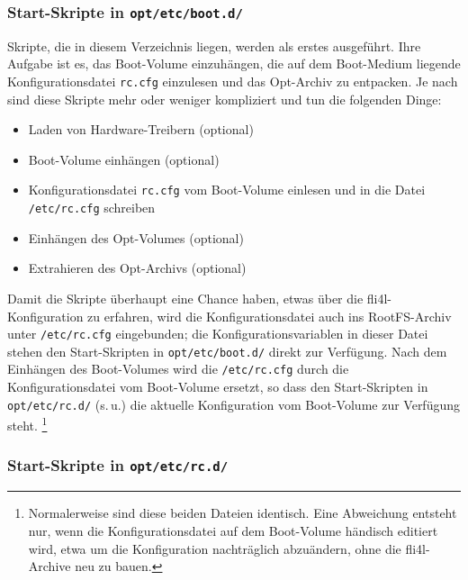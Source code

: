 
\subsubsection{Start-Skripte in \texttt{opt/etc/boot.d/}}

Skripte, die in diesem Verzeichnis liegen, werden als erstes
ausgeführt. Ihre Aufgabe ist es, das Boot-Volume einzuhängen, die
auf dem Boot-Medium liegende Konfigurationsdatei \texttt{rc.cfg} einzulesen und
das Opt-Archiv zu entpacken. Je nach 
sind diese Skripte mehr oder weniger kompliziert und tun die folgenden
Dinge:

\begin{itemize}
\item Laden von Hardware-Treibern (optional)
\item Boot-Volume einhängen (optional)
\item Konfigurationsdatei \texttt{rc.cfg} vom Boot-Volume einlesen und
      in die Datei \texttt{/etc/rc.cfg} schreiben
\item Einhängen des Opt-Volumes (optional)
\item Extrahieren des Opt-Archivs (optional)
\end{itemize}

Damit die Skripte überhaupt eine Chance haben, etwas über die
fli4l-Konfiguration zu erfahren, wird die Konfigurationsdatei auch ins
RootFS-Archiv unter \texttt{/etc/rc.cfg} eingebunden; die
Konfigurationsvariablen in dieser Datei stehen den Start-Skripten in
\texttt{opt/etc/boot.d/} direkt zur Verfügung. Nach dem Einhängen des
Boot-Volumes wird die \texttt{/etc/rc.cfg} durch die Konfigurationsdatei
vom Boot-Volume ersetzt, so dass den Start-Skripten in \texttt{opt/etc/rc.d/}
(s.\,u.) die aktuelle Konfiguration vom Boot-Volume zur Verfügung steht.
\footnote{Normalerweise sind diese beiden Dateien identisch. Eine Abweichung
entsteht nur, wenn die Konfigurationsdatei auf dem Boot-Volume händisch
editiert wird, etwa um die Konfiguration nachträglich abzuändern, ohne die
fli4l-Archive neu zu bauen.}

\subsubsection{Start-Skripte in \texttt{opt/etc/rc.d/}}

